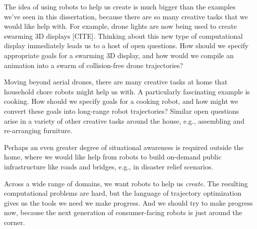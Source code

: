 The idea of using robots to help us create is much bigger than the examples we've seen in this dissertation, because there are so many creative tasks that we would like help with.
For example, drone lights are now being used to create swarming 3D displays [CITE].
Thinking about this new type of computational display immediately leads us to a host of open questions.
How should we specify appropriate goals for a swarming 3D display, and how would we compile an animation into a swarm of collision-free drone trajectories?

Moving beyond aerial drones, there are many creative tasks at home that household chore robots might help us with.
A particularly fascinating example is cooking. 
How should we specify goals for a cooking robot, and how might we convert these goals into long-range robot trajectories?
Similar open questions arise in a variety of other creative tasks around the house, e.g., assembling and re-arranging furniture.

Perhaps an even greater degree of situational awareness is required outside the home, where we would like help from robots to build on-demand public infrastructure like roads and bridges, e.g., in disaster relief scenarios.

Across a wide range of domains, we want robots to help us \emph{create}.
The resulting computational problems are hard, but the language of trajectory optimization gives us the tools we need we make progress.
And we should try to make progress now, because the next generation of consumer-facing robots is just around the corner.
